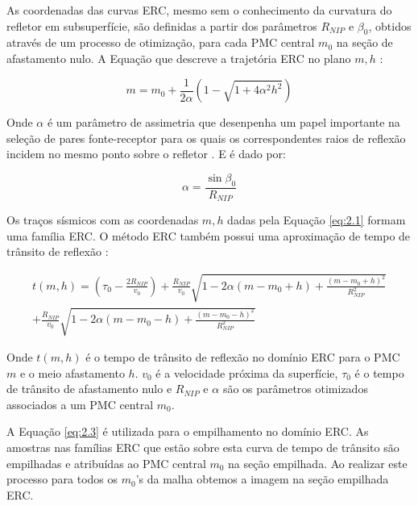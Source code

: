 As coordenadas das curvas ERC, mesmo sem o conhecimento da curvatura do refletor em subsuperfície, são definidas
a partir dos parâmetros $R_{NIP}$ e $\beta_0$, obtidos através de um processo de otimização, 
para cada PMC central $m_0$ na seção de afastamento nulo. A Equação que descreve a trajetória ERC no plano $m, h$ \cite{cre}:

\begin{equation}
 \label{eq:2.1}
 m= m_0 + \frac{1}{2\alpha} (1-\sqrt{1+4\alpha^2h^2})
\end{equation}

Onde $\alpha$ é um parâmetro de assimetria que desenpenha um papel importante na seleção de pares fonte-receptor para os quais
os correspondentes raios de reflexão incidem no mesmo ponto sobre o refletor \cite{tygel}. E é dado por:

\begin{equation}
\label{eq:2.2}
 \alpha=\frac{\sin{\beta_0}}{R_{NIP}}
\end{equation}

Os traços sísmicos com as coordenadas $m, h$ dadas pela Equação \ref{eq:2.1} formam uma família ERC.
O método ERC também possui uma aproximação de tempo de trânsito de
reflexão \cite{cre}:

\begin{multline}
\label{eq:2.3}
t(m,h)= \left( \tau_0-\frac{2R_{NIP}}{v_0} \right) 
+\frac{R_{NIP}}{v_0}\sqrt{1-2\alpha(m-m_0+h)+\frac{(m-m_0+h)^2}{R_{NIP}^2}} \\
+\frac{R_{NIP}}{v_0}\sqrt{1-2\alpha(m-m_0-h)+\frac{(m-m_0-h)^2}{R_{NIP}^2}}
\end{multline}

Onde $t(m,h)$ é o tempo de trânsito de reflexão no domínio ERC para o PMC $m$ e o meio afastamento $h$.
$v_0$ é a velocidade próxima da superfície, $\tau_0$ é o tempo de trânsito de afastamento nulo e 
$R_{NIP}$ e $\alpha$ são os parâmetros otimizados associados a um PMC central $m_0$.

A Equação \ref{eq:2.3} é utilizada para o empilhamento no domínio ERC. As amostras nas famílias ERC 
que estão sobre esta curva de tempo de trânsito são empilhadas e atribuídas ao PMC central $m_0$ na seção empilhada.
Ao realizar este processo para todos os $m_0$'s da malha obtemos a imagem na seção empilhada ERC.

